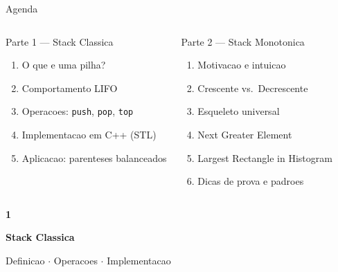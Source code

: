 \documentclass[aspectratio=169,11pt]{beamer}
\begin{document}
\begin{frame}{Agenda}
  \begin{columns}[t]
      \begin{block}{Parte 1 --- Stack Classica}
        \begin{enumerate}\small
          \item O que e uma pilha?
          \item Comportamento LIFO
          \item Operacoes: \texttt{push}, \texttt{pop}, \texttt{top}
          \item Implementacao em C++ (STL)
          \item Aplicacao: parenteses balanceados
        \end{enumerate}
      \end{block}
      \begin{block}{Parte 2 --- Stack Monotonica}
        \begin{enumerate}\small
          \item Motivacao e intuicao
          \item Crescente vs.\ Decrescente
          \item Esqueleto universal
          \item Next Greater Element
          \item Largest Rectangle in Histogram
          \item Dicas de prova e padroes
        \end{enumerate}
      \end{block}
  \end{columns}
\end{frame}

{
\begin{frame}[noframenumbering]
  \centering\vspace{1.2cm}
  {\fontsize{40}{48}\selectfont\bfseries\color{gemaBlue} 1}\par
  \vspace{0.3cm}
  {\Large\color{gemaCyan}\bfseries Stack Classica}\par
  \vspace{0.2cm}
  {\color{gray}\small Definicao $\cdot$ Operacoes $\cdot$ Implementacao}
\end{frame}
}
\end{document}
